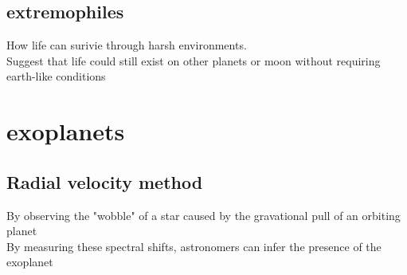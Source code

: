 \subsection{extremophiles}
How life can surivie through harsh environments.\\
Suggest that life could still exist on other planets or moon without requiring earth-like conditions\\

\section{exoplanets}
\subsection{Radial velocity method}
By observing the "wobble" of a star caused by the gravational pull of an orbiting planet\\
By measuring these spectral shifts, astronomers can infer the presence of the exoplanet\\